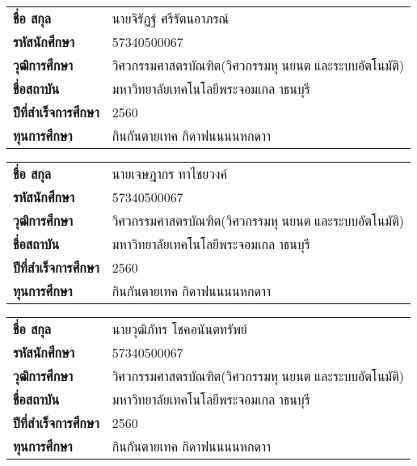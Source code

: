 \begin{vitae}
    \raggedright
	\begin{tabular}{p{} p{}}
        \textbf{ชื่อ สกุล} & {นายจิรัฏฐ์ ศรีรัตนอาภรณ์} \\
        \textbf{รหัสนักศึกษา} & {57340500067}\\
        \textbf{วุฒิการศึกษา} & {วิศวกรรมศาสตรบัณฑิต(วิศวกรรมหุนยนตและระบบอัตโนมัติ)}\\
        \textbf{ชื่อสถาบัน} & {มหาวิทยาลัยเทคโนโลยีพระจอมเกลาธนบุรี} \\
        \textbf{ปีที่สำเร็จการศึกษา} & {2560} \\
        \textbf{ทุนการศึกษา} &
			{กินกันตายเทค\newline}
			{กิดาฟนนนนหกดาา\newline}\\
    \end{tabular}   
\end{vitae}

\begin{vitae}
    \raggedright
	\begin{tabular}{p{} p{}}
        \textbf{ชื่อ สกุล} & {นายเจษฎากร ทาไชยวงค์} \\
        \textbf{รหัสนักศึกษา} & {57340500067}\\
        \textbf{วุฒิการศึกษา} & {วิศวกรรมศาสตรบัณฑิต(วิศวกรรมหุนยนตและระบบอัตโนมัติ)}\\
        \textbf{ชื่อสถาบัน} & {มหาวิทยาลัยเทคโนโลยีพระจอมเกลาธนบุรี} \\
        \textbf{ปีที่สำเร็จการศึกษา} & {2560} \\
        \textbf{ทุนการศึกษา} &
			{กินกันตายเทค\newline}
			{กิดาฟนนนนหกดาา\newline}\\
    \end{tabular}   
\end{vitae}

\begin{vitae}
    \raggedright
	\begin{tabular}{p{} p{}}
        \textbf{ชื่อ สกุล} & {นายวุฒิภัทร โชคอนันตทรัพย์} \\
        \textbf{รหัสนักศึกษา} & {57340500067}\\
        \textbf{วุฒิการศึกษา} & {วิศวกรรมศาสตรบัณฑิต(วิศวกรรมหุนยนตและระบบอัตโนมัติ)}\\
        \textbf{ชื่อสถาบัน} & {มหาวิทยาลัยเทคโนโลยีพระจอมเกลาธนบุรี} \\
        \textbf{ปีที่สำเร็จการศึกษา} & {2560} \\
        \textbf{ทุนการศึกษา} &
			{กินกันตายเทค\newline}
			{กิดาฟนนนนหกดาา\newline}\\
    \end{tabular}   
\end{vitae}
